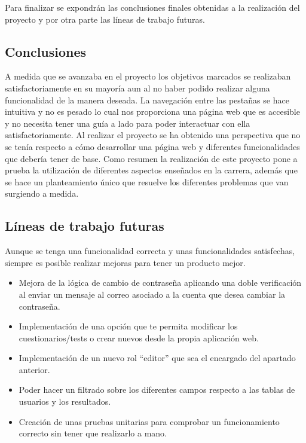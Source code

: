 
Para finalizar se expondrán las conclusiones finales obtenidas a la realización del proyecto y por otra parte las líneas de trabajo futuras.

\subsection{Conclusiones}
A medida que se avanzaba en el proyecto los objetivos marcados se realizaban satisfactoriamente en su mayoría aun al no haber podido realizar alguna funcionalidad de la manera deseada.
La navegación entre las pestañas se hace intuitiva y no es pesado lo cual nos proporciona una página web que es accesible y no necesita tener una guía a lado para poder interactuar con ella satisfactoriamente.
Al realizar el proyecto se ha obtenido una perspectiva que no se tenía respecto a cómo desarrollar una página web y diferentes funcionalidades que debería tener de base.
Como resumen la realización de este proyecto pone a prueba la utilización de diferentes aspectos enseñados en la carrera, además que se hace un planteamiento único que resuelve los diferentes problemas que van surgiendo a medida. 
\subsection{Líneas de trabajo futuras} 
Aunque se tenga una funcionalidad correcta y unas funcionalidades satisfechas, siempre es posible realizar mejoras para tener un producto mejor.
\begin{itemize}
    \item Mejora de la lógica de cambio de contraseña aplicando una doble verificación al enviar un mensaje al correo asociado a la cuenta que desea cambiar la contraseña.
    \item Implementación de una opción que te permita modificar los cuestionarios/tests o crear nuevos desde la propia aplicación web.
    \item Implementación de un nuevo rol “editor” que sea el encargado del apartado anterior.
    \item Poder hacer un filtrado sobre los diferentes campos respecto a las tablas de usuarios y los resultados.
    \item Creación de unas pruebas unitarias para comprobar un funcionamiento correcto sin tener que realizarlo a mano.
\end{itemize}
